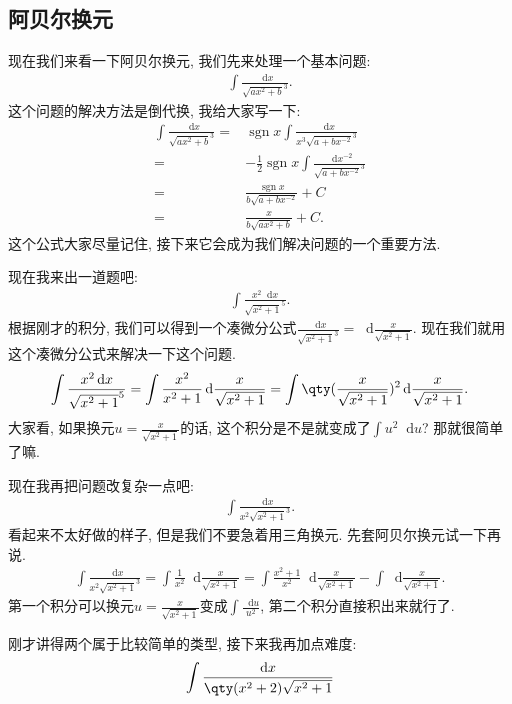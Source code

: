 \documentclass{ctexbook}
\DeclareMathOperator{\sgn}{sgn}
\newcommand*{\dif}{\mathop{}\!\mathrm{d}}
\begin{document}
{\subsection{阿贝尔换元}
现在我们来看一下阿贝尔换元, 我们先来处理一个基本问题: 
\begin{align*}
\int\frac{\dif{x}}{\sqrt{ax^{2}+b}^{3}}
.\end{align*}
这个问题的解决方法是倒代换, 我给大家写一下: 
\begin{align*}
\int\frac{\dif{x}}{\sqrt{ax^{2}+b}^{3}}={}&\sgn{x}\int\frac{\dif{x}}{x^{3}\sqrt{a+bx^{-2}}^{3}}\\
={}&-\frac{1}{2}\sgn{x}\int\frac{\dif{x^{-2}}}{\sqrt{a+bx^{-2}}^{3}}\\
={}&\frac{\sgn{x}}{b\sqrt{a+bx^{-2}}}+C\\
={}&\frac{x}{b\sqrt{ax^{2}+b}}+C
.\end{align*}
这个公式大家尽量记住, 接下来它会成为我们解决问题的一个重要方法. \par
现在我来出一道题吧: 
\begin{align*}
\int\frac{x^{2}\dif{x}}{\sqrt{x^{2}+1}^{5}}
.\end{align*}
根据刚才的积分, 我们可以得到一个凑微分公式$\frac{\dif{x}}{\sqrt{x^{2}+1}^{3}}=\dif{\frac{x}{\sqrt{x^{2}+1}}}$. 现在我们就用这个凑微分公式来解决一下这个问题. 
\begin{align*}
\int\frac{x^{2}\dif{x}}{\sqrt{x^{2}+1}^{5}}=\int\frac{x^{2}}{x^{2}+1}\dif{\frac{x}{\sqrt{x^{2}+1}}}=\int\qty(\frac{x}{\sqrt{x^{2}+1}})^{2}\dif{\frac{x}{\sqrt{x^{2}+1}}}
.\end{align*}
大家看, 如果换元$u=\frac{x}{\sqrt{x^{2}+1}}$的话, 这个积分是不是就变成了$\int u^{2}\dif{u}$? 那就很简单了嘛. \par
现在我再把问题改复杂一点吧: 
\begin{align*}
\int\frac{\dif{x}}{x^{2}\sqrt{x^{2}+1}^{3}}
.\end{align*}
看起来不太好做的样子, 但是我们不要急着用三角换元. 先套阿贝尔换元试一下再说. 
\begin{align*}
\int\frac{\dif{x}}{x^{2}\sqrt{x^{2}+1}^{3}}=\int\frac{1}{x^{2}}\dif{\frac{x}{\sqrt{x^{2}+1}}}=\int\frac{x^{2}+1}{x^{2}}\dif{\frac{x}{\sqrt{x^{2}+1}}}-\int\dif{\frac{x}{\sqrt{x^{2}+1}}}
.\end{align*}
第一个积分可以换元$u=\frac{x}{\sqrt{x^{2}+1}}$变成$\int\frac{\dif{u}}{u^{2}}$, 第二个积分直接积出来就行了. \par
刚才讲得两个属于比较简单的类型, 接下来我再加点难度: 
\begin{align*}
\int\frac{\dif{x}}{\qty(x^{2}+2)\sqrt{x^{2}+1}}

\end{align*}}
\end{document}
